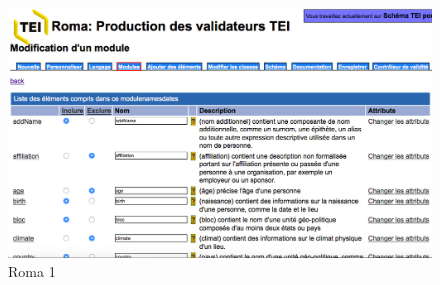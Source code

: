 \documentclass[12pt,a4paper]{book} %
\begin{document}
\begin{figure}[!h]
\centering
\begin{center}
\includegraphics[width=16cm]{6.JPG}
\end{center}
\caption{Roma 1}
\end{figure}





\backmatter

\listoffigures
\tableofcontents
\end{document}

